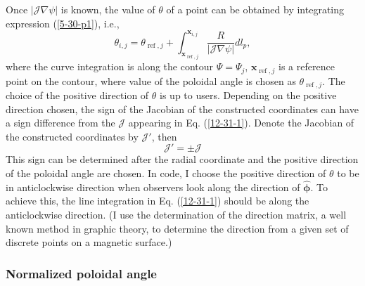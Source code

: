 \documentclass{llncs}
\newcommand{\tmmathbf}[1]{\ensuremath{\boldsymbol{#1}}}
\newcommand{\tmop}[1]{\ensuremath{\operatorname{#1}}}
\begin{document}
Once $|\mathcal{J} \nabla \psi |$ is known, the value of $\theta$ of a point
can be obtained by integrating expression (\ref{5-30-p1}), i.e.,
\begin{equation}
  \label{12-31-1} \theta_{i, j} = \theta_{\tmop{ref}, j} +
  \int_{\mathbf{x}_{\tmop{ref}, j}}^{\mathbf{x}_{i, j}} \frac{R}{|\mathcal{J}
  \nabla \psi |} d l_p,
\end{equation}
where the curve integration is along the contour $\Psi = \Psi_j$,
$\mathbf{x}_{\tmop{ref}, j}$ is a reference point on the contour, where value
of the poloidal angle is chosen as $\theta_{\tmop{ref}, j}$. The choice of the
positive direction of $\theta$ is up to users. Depending on the positive
direction chosen, the sign of the Jacobian of the constructed coordinates can
have a sign difference from the $\mathcal{J}$ appearing in Eq.
(\ref{12-31-1}). Denote the Jacobian of the constructed coordinates by
$\mathcal{J}'$, then
\begin{equation}
  \mathcal{J}' = \pm \mathcal{J}
\end{equation}
This sign can be determined after the radial coordinate and the positive
direction of the poloidal angle are chosen. In {} code, I
choose the positive direction of $\theta$ to be in anticlockwise direction
when observers look along the direction of $\hat{\tmmathbf{\phi}}$. To achieve
this, the line integration in Eq. (\ref{12-31-1}) should be along the
anticlockwise direction. (I use the determination of the direction matrix, a
well known method in graphic theory, to determine the direction from a given
set of discrete points on a magnetic surface.)

\subsubsection{Normalized poloidal angle}\label{17-10-19-2}
\end{document}
